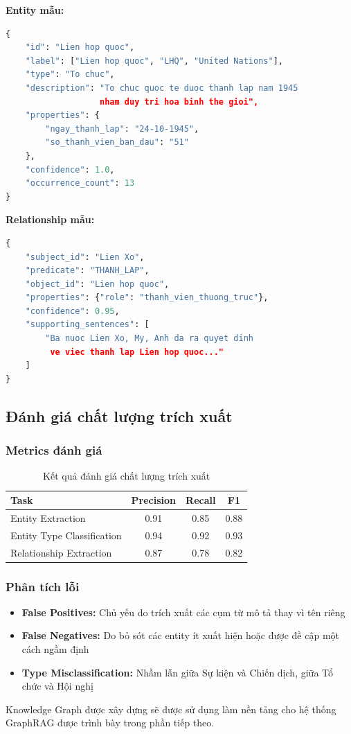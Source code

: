 \textbf{Entity mẫu:}
\begin{lstlisting}[language=Python, caption={Ví dụ entity Liên hợp quốc}]
{
    "id": "Lien hop quoc",
    "label": ["Lien hop quoc", "LHQ", "United Nations"],
    "type": "To chuc",
    "description": "To chuc quoc te duoc thanh lap nam 1945 
                   nham duy tri hoa binh the gioi",
    "properties": {
        "ngay_thanh_lap": "24-10-1945",
        "so_thanh_vien_ban_dau": "51"
    },
    "confidence": 1.0,
    "occurrence_count": 13
}
\end{lstlisting}

\textbf{Relationship mẫu:}
\begin{lstlisting}[language=Python, caption={Ví dụ relationship}]
{
    "subject_id": "Lien Xo",
    "predicate": "THANH_LAP",
    "object_id": "Lien hop quoc",
    "properties": {"role": "thanh_vien_thuong_truc"},
    "confidence": 0.95,
    "supporting_sentences": [
        "Ba nuoc Lien Xo, My, Anh da ra quyet dinh 
         ve viec thanh lap Lien hop quoc..."
    ]
}
\end{lstlisting}

\subsection{Đánh giá chất lượng trích xuất}

\subsubsection{Metrics đánh giá}

\begin{table}[H]
\centering
\caption{Kết quả đánh giá chất lượng trích xuất}
\label{tab:extraction-quality}
\begin{tabular}{|l|c|c|c|}
\hline
\textbf{Task} & \textbf{Precision} & \textbf{Recall} & \textbf{F1} \\
\hline
Entity Extraction & 0.91 & 0.85 & 0.88 \\
Entity Type Classification & 0.94 & 0.92 & 0.93 \\
Relationship Extraction & 0.87 & 0.78 & 0.82 \\
\hline
\end{tabular}
\end{table}

\subsubsection{Phân tích lỗi}

\begin{itemize}
    \item \textbf{False Positives:} Chủ yếu do trích xuất các cụm từ mô tả thay vì tên riêng
    \item \textbf{False Negatives:} Do bỏ sót các entity ít xuất hiện hoặc được đề cập một cách ngầm định
    \item \textbf{Type Misclassification:} Nhầm lẫn giữa Sự kiện và Chiến dịch, giữa Tổ chức và Hội nghị
\end{itemize}

Knowledge Graph được xây dựng sẽ được sử dụng làm nền tảng cho hệ thống GraphRAG được trình bày trong phần tiếp theo.
